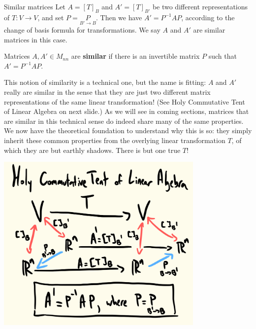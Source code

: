 \begin{frame}{Similar matrices}
Let $A=[T]_B$ and $A'=[T]_{B'}$ be two different representations of $T\colon V\rightarrow V$, and set $P=\underset{B'\rightarrow B}{P}$. Then we have $A'=P^{-1}AP$, according to the change of basis formula for transformations.  We say $A$ and $A'$ are \alert{similar matrices} in this case. 
\pause
\begin{definition}
Matrices $A, A'\in M_{nn}$ are {\bf similar} if there is an invertible matrix $P$ such that $A'=P^{-1}AP$. 
\end{definition} 
\bpause
This notion of similarity is a technical one, but the name is fitting: $A$ and $A'$ really are similar in the sense that they are just two different matrix representations of the same linear transformation! (See Holy Commutative Tent of Linear Algebra on next slide.) 
\bpause 
As we will see in coming sections, matrices that are similar in this technical sense do indeed share many of the same properties. We now have the theoretical foundation to understand why this is so: they simply inherit these common properties from the overlying linear transformation $T$, of which they are but earthly shadows. 
\bpause
There is but one true $T$!
\end{frame}
\begin{frame}
\includegraphics[width=4in]{Images/HolyCommutativeTent}

\end{frame}
